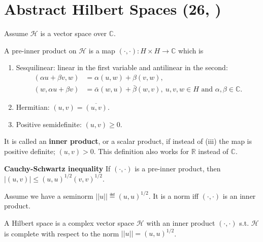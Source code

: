 \section{Abstract Hilbert Spaces \tiny{(26, \cite{schilling2017measures})}}
Assume \(\mathcal{H}\) is a vector space over \(\mathbb{C}\).
\begin{definition}
    A pre-inner product on \(\mathcal{H}\) is a map \((\cdot,\cdot):H\times H\rightarrow\mathbb{C}\) which is
    \begin{enumerate}[label=(\roman*)]
        \item Sesquilinear: linear in the first variable and antilinear in the second:
        \begin{align*}
            (\alpha u + \beta v, w) &= \alpha(u,w) + \beta(v,w), \\
            (w, \alpha u + \beta v) &= \bar{\alpha}(w,u) + \bar{\beta}(w,v), \ u,v,w\in H \text{ and } \alpha,\beta\in\mathbb{C}.
        \end{align*}
        \item Hermitian: \((u,v)=\overline{(u,v)}\).
        \item Positive semidefinite: \((u,v)\geq 0\).
    \end{enumerate}
    It is called an \textbf{inner product}, or a scalar product, if instead of (iii) the map is positive definite; \((u,v)>0\). This definition
    also works for \(\mathbb{R}\) instead of \(\mathbb{C}\).
\end{definition}
\textbf{Cauchy-Schwartz inequality} If \((\cdot, \cdot)\) is a pre-inner product, then \(\vert (u,v)\vert \leq (u,u)^{1/2}(v,v)^{1/2}\).
\begin{corollary}
    Assume we have a seminorm \(||u||\eqdef (u,u)^{1/2}\). It is a norm iff \((\cdot,\cdot)\) is an inner product.
\end{corollary}
\begin{definition}
    A Hilbert space is a complex vector space \(\mathcal{H}\) with an inner product \((\cdot,\cdot)\) s.t. \(\mathcal{H}\) is complete with respect to the norm
    \(||u|| = (u,u)^{1/2}\).
\end{definition}


